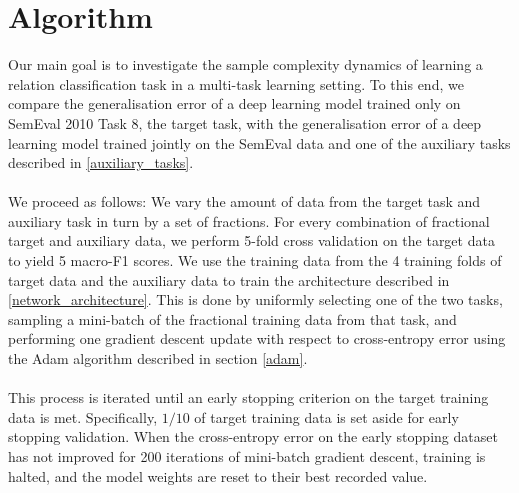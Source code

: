 \section{Algorithm}

Our main goal is to investigate the sample complexity dynamics of learning a relation classification task in a multi-task learning setting. To this end, we compare the generalisation error of a deep learning model trained only on SemEval 2010 Task 8, the target task, with the generalisation error of a deep learning model trained jointly on the SemEval data and one of the auxiliary tasks described in \ref{auxiliary_tasks}.
\\\\
We proceed as follows: We vary the amount of data from the target task and auxiliary task in turn by a set of fractions. For every combination of fractional target and auxiliary data, we perform 5-fold cross validation on the target data to yield 5 macro-F1 scores. We use the training data from the 4 training folds of target data and the auxiliary data to train the architecture described in \ref{network_architecture}. This is done by uniformly selecting one of the two tasks, sampling a mini-batch of the fractional training data from that task, and performing one gradient descent update with respect to cross-entropy error using the Adam algorithm described in section \ref{adam}. 
\\\\
This process is iterated until an early stopping criterion on the target training data is met. Specifically, $1/10$ of target training data is set aside for early stopping validation. When the cross-entropy error on the early stopping dataset has not improved for 200 iterations of mini-batch gradient descent, training is halted, and the model weights are reset to their best recorded value.

